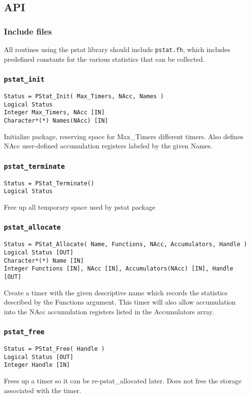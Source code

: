 \subsection{API}

\subsubsection{Include files}
All routines using the pstat library should include \verb+pstat.fh+,
which includes predefined constants for the various statistics that
can be collected.

\subsubsection{{\tt pstat\_init}}
\begin{verbatim}
Status = PStat_Init( Max_Timers, NAcc, Names )
Logical Status
Integer Max_Timers, NAcc [IN]
Character*(*) Names(NAcc) [IN]
\end{verbatim}
Initialize package, reserving space for Max\_Timers different
timers.  Also defines NAcc user-defined accumulation registers
labeled by the given Names.

\subsubsection{{\tt pstat\_terminate}}
\begin{verbatim}
Status = PStat_Terminate()
Logical Status
\end{verbatim}
Free up all temporary space used by pstat package

\subsubsection{{\tt pstat\_allocate}}
\begin{verbatim}
Status = PStat_Allocate( Name, Functions, NAcc, Accumulators, Handle )
Logical Status [OUT]
Character*(*) Name [IN]
Integer Functions [IN], NAcc [IN], Accumulators(NAcc) [IN], Handle [OUT]
\end{verbatim}
Create a timer with the given descriptive name which records
the statistics described by the Functions argument. This timer
will also allow accumulation into the NAcc accumulation
registers listed in the Accumulators array.

\subsubsection{{\tt pstat\_free}}
\begin{verbatim}
Status = PStat_Free( Handle )
Logical Status [OUT]
Integer Handle [IN]
\end{verbatim}
Frees up a timer so it can be re-pstat\_allocated later.  Does
not free the storage associated with the timer.

